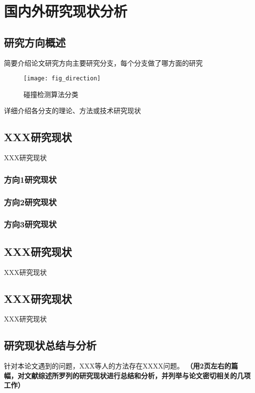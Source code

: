 \section{国内外研究现状分析}

\subsection{研究方向概述}
简要介绍论文研究方向主要研究分支，每个分支做了哪方面的研究

\begin{figure}[h]
  \centering
  \texttt{[image: fig\_direction]}
  \caption{碰撞检测算法分类}
\end{figure}

\zhlipsum[1]

详细介绍各分支的理论、方法或技术研究现状

\subsection{XXX研究现状}
XXX研究现状

\subsubsection{方向1研究现状}
\subsubsection{方向2研究现状}
\subsubsection{方向3研究现状}

\subsection{XXX研究现状}
XXX研究现状

\subsection{XXX研究现状}
XXX研究现状

\subsection{研究现状总结与分析}
针对本论文遇到的问题，XXX等人的方法存在XXXX问题。
\textbf{\color{red}
（用2页左右的篇幅，对文献综述所罗列的研究现状进行总结和分析，并列举与论文密切相关的几项工作）}


